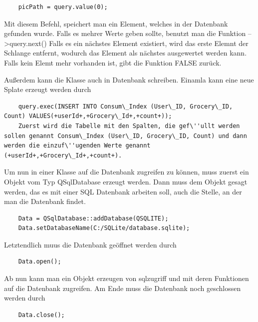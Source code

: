 \documentclass[11pt,a4paper]{article} %
\begin{document}
	\begin{frame}

\begin{lstlisting}
	picPath = query.value(0);
	\end{lstlisting}
\end{frame}
	Mit diesem Befehl, speichert man ein Element, welches in der Datenbank gefunden wurde. Falls es mehrer Werte geben sollte, benutzt man die Funktion -->query.next()
	Falls es ein nächstes Element existiert, wird das erste Elemnt der Schlange entfernt, wodurch das Element als nächstes ausgewertet werden kann. Falls kein Elemt mehr vorhanden ist, gibt die Funktion FALSE zurück.
\par	
	Außerdem kann die Klasse auch in Datenbank schreiben. Einamla kann eine neue Splate erzeugt werden durch
	
	\begin{frame}

\begin{lstlisting}
	query.exec(INSERT INTO Consum\_Index (User\_ID, Grocery\_ID, Count) VALUES(+userId+,+Grocery\_Id+,+count+));
	Zuerst wird die Tabelle mit den Spalten, die gef\''ullt werden sollen genannt Consum\_Index (User\_ID, Grocery\_ID, Count) und dann werden die einzuf\''ugenden Werte genannt (+userId+,+Grocery\_Id+,+count+).
	\end{lstlisting}
\end{frame}
\par	
	Um nun in einer Klasse auf die Datenbank zugreifen zu können, muss zuerst ein Objekt vom Typ QSqlDatabase erzeugt werden. Dann muss dem Objekt gesagt werden, das es mit einer SQL Datenbank arbeiten soll,
	auch die Stelle, an der man die Datenbank findet.
	\begin{frame}

\begin{lstlisting}
	Data = QSqlDatabase::addDatabase(QSQLITE);
	Data.setDatabaseName(C:/SQLite/database.sqlite);
	\end{lstlisting}
\end{frame}
\par	
	Letztendlich muus die Datenbank geöffnet werden durch
	\begin{frame}

\begin{lstlisting}
	Data.open();
		\end{lstlisting}
\end{frame}
	Ab nun kann man ein Objekt erzeugen von sqlzugriff und mit deren Funktionen auf die Datenbank zugreifen.
	Am Ende muss die Datenbank noch geschlossen werden durch
		\begin{frame}

\begin{lstlisting}
	Data.close();
	\end{lstlisting}
\end{frame}
\par	
\end{document}
